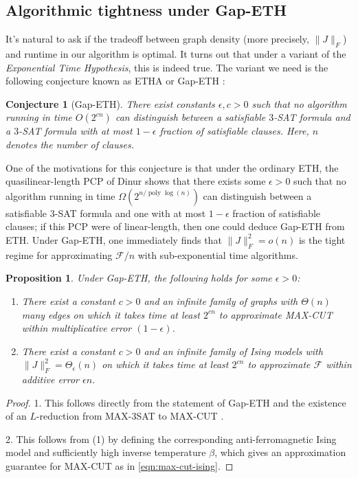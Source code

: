 \documentclass[11pt, oneside, english]{article}
\newcommand{\F}{\mathcal{F}}
\DeclareMathOperator{\poly}{poly}
\newtheorem{proposition}[theorem]{Proposition}
\newtheorem{conjecture}[theorem]{Conjecture}
\theoremstyle{definition}
\theoremstyle{plain}
\begin{document}
\subsection{Algorithmic tightness under Gap-ETH}
It's natural to ask if the tradeoff between graph density (more precisely, $\|J\|_F$) and runtime in our algorithm is optimal. It turns out that under a variant of the \emph{Exponential Time Hypothesis}, this is indeed true. The variant we need is the following conjecture known as ETHA or Gap-ETH \cite{manurangsi2017birthday}:
\begin{conjecture}[Gap-ETH]
There exist constants $\epsilon, c > 0$ such that no algorithm running in time $O(2^{cn})$ can distinguish between a satisfiable $3$-SAT formula and a $3$-SAT formula with at most $1 - \epsilon$ fraction of satisfiable clauses. Here, $n$ denotes the number of clauses.
\end{conjecture}
One of the motivations for this conjecture is that under the ordinary ETH, the quasilinear-length PCP of Dinur \cite{dinur2007pcp} shows that there exists some $\epsilon > 0$ such that no algorithm running in time $\Omega(2^{n/\poly\log(n)})$ can distinguish between a satisfiable $3$-SAT formula and one with at most $1-\epsilon$ fraction of satisfiable clauses; if this PCP were of linear-length, then one could deduce Gap-ETH from ETH. Under Gap-ETH, one immediately finds that $\|J\|_F^2 = o(n)$ is the tight regime for approximating $\F/n$ with sub-exponential time algorithms.
\begin{proposition}\label{prop:max-cut-eth}
Under Gap-ETH, the following holds for some $\epsilon> 0$:
\begin{enumerate}
\item There exist a constant $c>0$ and an infinite family of graphs with $\Theta(n)$ many edges on which it takes time at least $2^{cn}$ to approximate MAX-CUT within multiplicative error $(1 - \epsilon)$.
\item There exist a constant $c>0$ and an infinite family of Ising models with $\|J\|_F^2 = \Theta_{\epsilon}(n)$ on which it takes time at least $2^{cn}$ to approximate $\F$ within additive error $\epsilon n$.
\end{enumerate}
\end{proposition}
\begin{proof}
1. This follows directly from the statement of Gap-ETH and the existence of an $L$-reduction from MAX-3SAT to MAX-CUT \cite{papadimitriou1991optimization}.

2. This follows from (1) by defining the corresponding anti-ferromagnetic Ising model and sufficiently high inverse temperature $\beta$, which gives an approximation guarantee for MAX-CUT as in \cref{eqn:max-cut-ising}. 
\end{proof}
\end{document}
